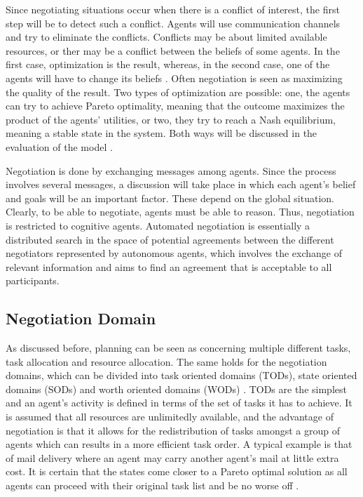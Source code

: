 Since negotiating situations occur when there is a conflict of interest, the first step will be to detect such a conflict. Agents will use communication channels and try to eliminate the conflicts. Conflicts may be about limited available resources, or ther may be a conflict between the beliefs of some agents. In the first case, optimization is the result, whereas, in the second case, one of the agents will have to change its beliefs \citep{shen2003multi}. Often negotiation is seen as maximizing the quality of the result. Two types of optimization are possible: one, the agents can try to achieve Pareto optimality, meaning that the outcome maximizes the product of the agents' utilities, or two, they try to reach a Nash equilibrium, meaning a stable state in the system. Both ways will be discussed in the evaluation of the model .

Negotiation is done by exchanging messages among agents. Since the process involves several messages, a discussion will take place in which each agent's belief and goals will be an important factor. These depend on the global situation. Clearly, to be able to negotiate, agents must be able to reason. Thus, negotiation is restricted to cognitive agents. Automated negotiation is essentially a distributed search in the space of potential agreements between the different negotiators represented by autonomous agents, which involves the exchange of relevant information and aims to find an agreement that is acceptable to all participants.

\subsection{Negotiation Domain}

As discussed before, planning can be seen as concerning multiple different tasks, task allocation and resource allocation. The same holds for the negotiation domains, which can be divided into task oriented domains (TODs), state oriented domains (SODs) and worth oriented domains (WODs) \citep{rosenschein1994rules}. TODs are the simplest and an agent's activity is defined in terms of the set of tasks it has to achieve. It is assumed that all resources are unlimitedly available, and the advantage of negotiation is that it allows for the redistribution of tasks amongst a group of agents which can results in a more efficient task order. A typical example is that of mail delivery where an agent may carry another agent's mail at little extra cost. It is certain that the states come closer to a Pareto optimal solution as all agents can proceed with their original task list and be no worse off \citep{rosenschein1994rules}. 

